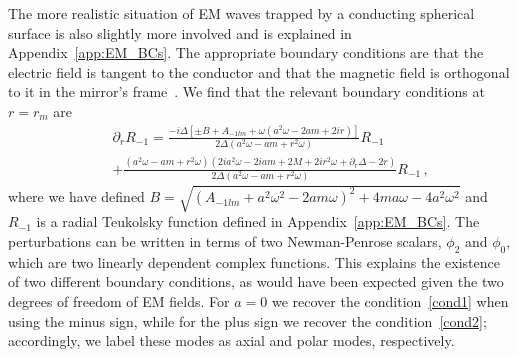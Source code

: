 \documentclass[11pt]{article}
\def\beq{\begin{eqnarray}}
\def\eeq{\end{eqnarray}}
\numberwithin{equation}{section} %
\begin{document}
The more realistic situation of EM waves trapped by a conducting spherical surface is also slightly more involved and is 
explained in Appendix~\ref{app:EM_BCs}.
The appropriate boundary conditions are that the electric field is tangent to the conductor and that the magnetic field is orthogonal to it in the mirror's frame~\cite{Jackson,King:1977}.
We find that the relevant boundary conditions at $r=r_m$ are
%
\beq
&&\partial_r R_{-1}=\frac{-i\Delta\left[\pm B+A_{-1lm}+\omega  \left(a^2 \omega -2 a m+2 i
   r\right)\right]}{2 \Delta\left(a^2 \omega -a m+r^2 \omega \right)}R_{-1}\nonumber\\
&&		+\frac{\left(a^2 \omega -a m+r^2 \omega \right) \left(2 i a^2 \omega -2 i a m+2 M+2 i r^2 \omega+ \partial_r\Delta-2  r\right)}{2 \Delta\left(a^2 \omega -a m+r^2 \omega \right)}R_{-1}\,,\label{cond1_a}
\eeq
%
where we have defined $B=\sqrt{(A_{-1lm}+a^2\omega^2-2am\omega)^2+4ma\omega-4a^2\omega^2}$ and $R_{-1}$ is a radial Teukolsky function defined in Appendix~\ref{app:EM_BCs}.
The perturbations can be written in terms of two Newman-Penrose scalars, $\phi_2$ and $\phi_0$, which are two linearly 
dependent complex functions. This explains the existence of two different boundary conditions, as would have been 
expected given the two degrees of freedom of EM fields. For $a=0$ we recover the condition~\eqref{cond1} when using the 
minus sign, while for the plus sign we recover the condition~\eqref{cond2}; accordingly, we label these modes as axial 
and polar modes, respectively.
\end{document}
